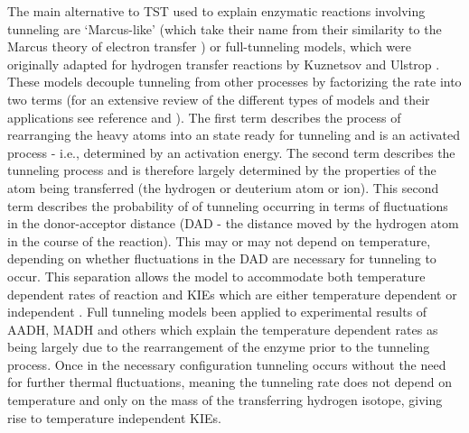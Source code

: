 The main alternative to TST used to explain enzymatic reactions involving tunneling are `Marcus-like' (which take their name from their similarity to the Marcus theory of electron transfer \cite{marcusElectronTransfersChemistry1985}) or full-tunneling models, which were originally adapted for hydrogen transfer reactions by Kuznetsov and Ulstrop \cite{kuznetsovProtonHydrogenAtom1999a}. These models decouple tunneling from other processes by factorizing the rate into two terms \cite{kuznetsovProtonHydrogenAtom1999a, antoniouLargeKineticIsotope1997, knappTemperatureDependentIsotopeEffects2002} (for an extensive review of the different types of models and their applications see reference \cite{puMultidimensionalTunnelingRecrossing2006} and \cite[chapters 4, 5 and 6 ]{allemannQuantumTunnellingEnzymeCatalysed2004}). The first term describes the process of rearranging the heavy atoms into an state ready for tunneling and is an activated process - i.e., determined by an activation energy. The second term describes the tunneling process and is therefore  largely determined by the properties of the atom being transferred (the hydrogen or deuterium atom or ion). This second term describes  the probability of of tunneling occurring  in terms of fluctuations in the donor-acceptor distance (DAD - the distance moved by the hydrogen atom in the course of the reaction). This may or may not depend on temperature, depending on whether fluctuations in the DAD are necessary for tunneling to occur. This separation allows the model to accommodate both temperature dependent rates of reaction and KIEs which are either temperature dependent or independent \cite{klinmanHydrogenTunnelingLinks2013}. Full tunneling models been applied to experimental results of AADH, MADH and others \cite{johannissenProtonTunnelingAromatic2007, johannissenEnzymeAromaticAmine2008, masgrau2004hydrogen, sutcliffeHydrogenTunnellingEnzymecatalysed2006, stojkovic2012effects, klinmanHydrogenTunnelingLinks2013, puMultidimensionalTunnelingRecrossing2006} which explain the temperature dependent rates as being largely due to the rearrangement of the enzyme prior to the tunneling process.  Once in the necessary configuration tunneling occurs without the need for further thermal fluctuations, meaning the tunneling rate does not depend on temperature and only on the mass of the transferring hydrogen isotope, giving rise to temperature independent KIEs.

